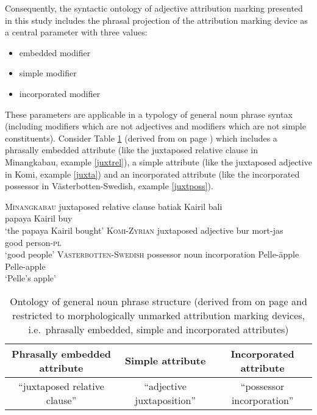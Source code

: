 Consequently, the syntactic ontology of adjective attribution marking presented in this study includes the phrasal projection of the attribution marking device as a central parameter with three values:
\begin{itemize}
\item embedded modifier
\item simple modifier
\item incorporated modifier
\end{itemize}
These parameters are applicable in a typology of general noun phrase syntax (including modifiers which are not adjectives and modifiers which are not simple constituents). Consider Table  \ref{ontologyderived} (derived from  on page \pageref{syntaxontology}) which includes a phrasally embedded attribute (like the juxtaposed relative clause in Minangkabau, example \ref{juxtrel}), a simple attribute (like the juxtaposed adjective in Komi, example \ref{juxta}) and an incorporated attribute (like the incorporated possessor in Västerbotten-Swedish, example \ref{juxtposs}).
\begin{exe}
\ex
\begin{xlist}
\ex \textsc{Minangkabau} juxtaposed relative clause \citep[3–4]{gil2005} \label{juxtrel}
\gll batiak Kairil bali\\
	papaya Kairil buy\\
\glt	‘the papaya Kairil bought’
\ex \textsc{Komi-Zyrian} juxtaposed adjective \citep[287]{lytkin1966a} \label{juxta}
\gll		bur	mort-jas\\
		good	person-\textsc{pl}\\
\glt		‘good people’
\ex \textsc{Västerbotten-Swedish} possessor noun incorporation \citep[3–4]{gil2005} \label{juxtposs}
\gll	Pelle-äpple\\
	Pelle-apple\\
\glt	‘Pelle's apple’
\end{xlist}
\end{exe}

\begin{table}
\begin{center}
\begin{footnotesize}
\begin{tabular}{c | c | c}
\hline
\hline
Phrasally embedded	attribute	&Simple attribute			&Incorporated attribute\\
\hline	
“juxtaposed relative clause”	&“adjective juxtaposition”		&“possessor incorporation”\\
\hline
\hline
\hline
\end{tabular}
\caption[Ontology of general noun phrase structure]{Ontology of general noun phrase structure (derived from  on page \pageref{syntaxontology} and restricted to morphologically unmarked attribution marking devices, i.e.~phrasally embedded, simple and incorporated attributes)}\label{ontologyderived}
\end{footnotesize}
\end{center}
\end{table}

